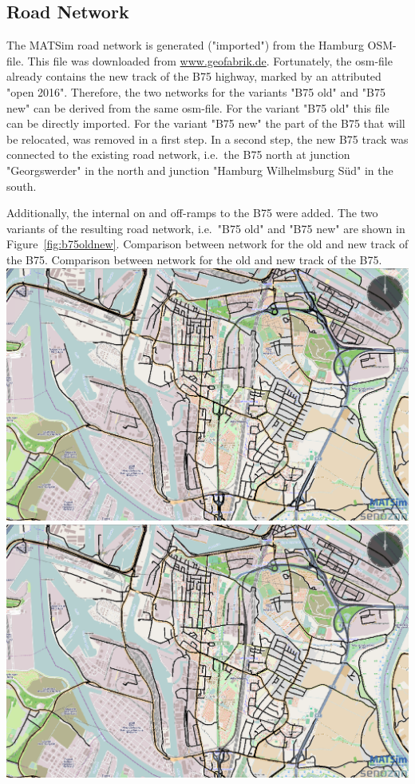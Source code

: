 \subsection{Road Network}
The MATSim road network is generated ("imported") from the Hamburg OSM-file. This file was downloaded from \url{www.geofabrik.de}. Fortunately, the osm-file already contains the new track of the B75 highway, marked by an attributed "open 2016". Therefore, the two networks for the variants "B75 old" and "B75 new" can be derived from the same osm-file. For the variant "B75 old" this file can be directly imported. For the variant "B75 new" the part of the B75 that will be relocated, was removed in a first step. In a second step, the new B75 track was connected to the existing road network, i.e.\ the B75 north at junction "Georgswerder" in the north and junction "Hamburg Wilhelmsburg Süd" in the south.

Additionally, the internal on and off-ramps to the B75 were added. The two variants of the resulting road network, i.e.\ "B75 old" and "B75 new" are shown in Figure~\ref{fig:b75oldnew}.
%
%
\createfigure%
{Comparison between network for the old and new track of the B75.}%
{Comparison between network for the old and new track of the B75.}%
{\label{fig:b75oldnew}}%
{%
  \createsubfigure%
  {}%
  {\includegraphics[width=.475\linewidth]{using/figures/B75old}}%
  {}%
  {}%
  \createsubfigure%
  {}%
  {\includegraphics[width=.475\linewidth]{using/figures/B75new}}
  {}%
  {}%
}%
  {}%


